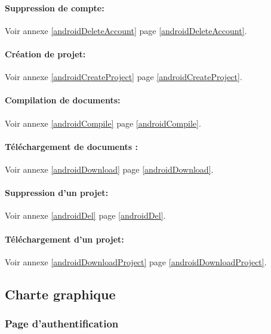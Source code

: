 \documentclass[a4paper,12pt]{article}
\begin{document}
\paragraph{Suppression de compte:\\}
Voir annexe \ref{androidDeleteAccount} page \ref{androidDeleteAccount}.

\paragraph{Création de projet:\\}
Voir annexe \ref{androidCreateProject} page \ref{androidCreateProject}.

\paragraph{Compilation de documents:\\}
Voir annexe \ref{androidCompile} page \ref{androidCompile}.

\paragraph{Téléchargement de documents :\\}
Voir annexe \ref{androidDownload} page \ref{androidDownload}.

\paragraph{Suppression d'un projet:\\}
Voir annexe \ref{androidDel} page \ref{androidDel}.

\paragraph{Téléchargement d'un projet:\\}
Voir annexe \ref{androidDownloadProject} page \ref{androidDownloadProject}.


\subsection{Charte graphique}
\subsubsection{Page d'authentification}
\end{document}
